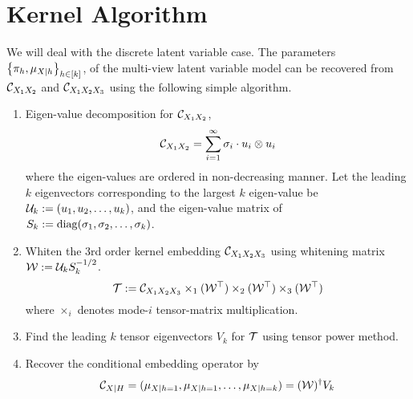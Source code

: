 \documentclass{article}
\begin{document}


\section{Kernel Algorithm}

We will deal with the discrete latent variable case.
The parameters $\left\{\pi_h, \mu_{X|h}\right\}_{h \in [k]}$, of the multi-view latent variable model can be recovered from $\mathcal{C}_{X_1 X_2}$ and $\mathcal{C}_{X_1 X_2 X_3}$ using the following simple algorithm.
\begin{enumerate}
  \item Eigen-value decomposition for $\mathcal{C}_{X_1 X_2}$,
    $$\mathcal{C}_{X_1 X_2} = \sum_{i=1}^{\infty} \sigma_i \cdot u_i \otimes u_i$$
    where the eigen-values are ordered in non-decreasing manner. Let the leading $k$ eigenvectors corresponding to the largest $k$ eigen-value be  $\mathcal{U}_k:=(u_1,u_2,\ldots,u_k)$, and the eigen-value matrix of $S_k:=\mathop{\mathrm{diag}}(\sigma_1,\sigma_2,\ldots,\sigma_k)$.
  \item Whiten the 3rd order kernel embedding $\mathcal{C}_{X_1 X_2 X_3}$ using whitening matrix $\mathcal{W}:= \mathcal{U}_k S_k^{-1/2}$.
    $${\mathcal{T}} := \mathcal{C}_{X_1 X_2 X_3} \times_1 (\mathcal{W}^\top) \times_2 (\mathcal{W}^\top) \times_3 (\mathcal{W}^\top)$$
    where $\times_i$ denotes mode-$i$ tensor-matrix multiplication.
  \item Find the leading $k$ tensor eigenvectors $V_k$ for ${\mathcal{T}}$ using tensor power method.
  \item Recover the conditional embedding operator by
    $$ \mathcal{C}_{X|H} = (\mu_{X|h=1},\mu_{X|h=1},\ldots,\mu_{X|h=k}) = (\mathcal{W})^\dagger V_k $$
\end{enumerate}
\end{document}
